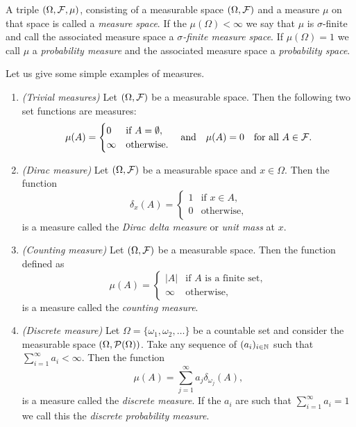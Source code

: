A triple $(\Omega, \mathcal F, \mu)$, consisting of a measurable space $(\Omega, \mathcal F)$ and a measure $\mu$ on that space is called a \emph{measure space}. If the $\mu(\Omega) < \infty$ we say that $\mu$ is $\sigma$-finite and call the associated measure space a \emph{$\sigma$-finite measure space}. If $\mu(\Omega) = 1$ we call $\mu$ a \emph{probability measure} and the associated measure space a \emph{probability space}.

Let us give some simple examples of measures.

\begin{example}
\hfil
\begin{enumerate}
\item \textit{(Trivial measures)} Let $(\Omega, \mathcal F)$ be a measurable space. Then the following two set functions are measures:
\[
	\mu(A) = \begin{cases}
		0 &\text{if } A = \emptyset, \\
		\infty &\text{otherwise.}
	\end{cases}
	\quad \text{and} \quad
	\mu(A) = 0 \quad \text{for all } A \in \mathcal F.
\]
\item \textit{(Dirac measure)} Let $(\Omega, \mathcal F)$ be a measurable space and $x \in \Omega$. Then the function
\[
	\delta_x(A) = \begin{cases}
		1 &\text{if } x \in A, \\
		0 &\text{otherwise},
	\end{cases}
\]
is a measure called the \emph{Dirac delta measure} or \emph{unit mass} at $x$.
\item \textit{(Counting measure)} Let $(\Omega, \mathcal F)$ be a measurable space. Then the function defined as
\[
	\mu(A) = \begin{cases}
		|A| &\text{if $A$ is a finite set},\\
		\infty &\text{otherwise}, 
	\end{cases}
\]
is a measure called the \emph{counting measure}.
\item \textit{(Discrete measure)} Let $\Omega = \{\omega_1, \omega_2, \dots\}$ be a countable set and consider the measurable space $(\Omega, \mathcal P(\Omega))$. Take any sequence of $(a_i)_{i \in \mathbb N}$ such that $\sum_{i = 1}^\infty a_i < \infty$. Then the function
\[
	\mu(A) = \sum_{j = 1}^\infty a_j \delta_{\omega_j}(A),
\]
is a measure called the \emph{discrete measure}. If the $a_i$ are such that $\sum_{i = 1}^\infty a_i = 1$ we call this the \emph{discrete probability measure}.
\end{enumerate}
\end{example}

